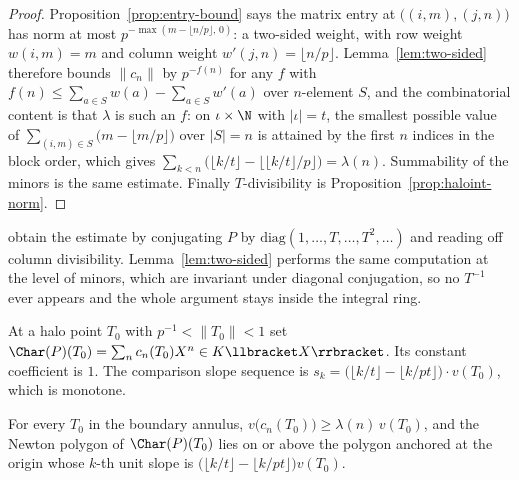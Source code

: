 \begin{proof}
  \leanok
  Proposition~\ref{prop:entry-bound} says the matrix entry at $\bigl((i,m),(j,n)\bigr)$ has norm
  at most $p^{-\max(m-\lfloor n/p\rfloor,\,0)}$: a two-sided weight, with row weight
  $w(i,m) = m$ and column weight $w'(j,n) = \lfloor n/p\rfloor$.  Lemma~\ref{lem:two-sided}
  therefore bounds $\lVert c_n\rVert$ by $p^{-f(n)}$ for any $f$ with
  $f(n)\leq \sum_{a\in S}w(a) - \sum_{a\in S}w'(a)$ over $n$-element $S$, and the combinatorial
  content is that $\lambda$ is such an $f$: on $\iota\times\N$ with $\lvert\iota\rvert = t$, the
  smallest possible value of $\sum_{(i,m)\in S}\bigl(m - \lfloor m/p\rfloor\bigr)$ over
  $\lvert S\rvert = n$ is attained by the first $n$ indices in the block order, which gives
  $\sum_{k<n}\bigl(\lfloor k/t\rfloor - \lfloor \lfloor k/t\rfloor/p\rfloor\bigr) = \lambda(n)$.
  Summability of the minors is the same estimate.  Finally $T$-divisibility is
  Proposition~\ref{prop:haloint-norm}.
\end{proof}

\cite{LWX} obtain the estimate by conjugating $P$ by $\mathrm{diag}(1,\dots,T,\dots,T^2,\dots)$
and reading off column divisibility.  Lemma~\ref{lem:two-sided} performs the same computation at
the level of minors, which are invariant under diagonal conjugation, so no $T^{-1}$ ever appears
and the whole argument stays inside the integral ring.

\begin{definition}
  \label{def:speccharseries}
  \leanok
  At a halo point $T_0$ with $p^{-1}<\lVert T_0\rVert<1$ set
  $\Char(P)(T_0) = \sum_n c_n(T_0)X^n \in K\llbracket X\rrbracket$.  Its constant coefficient is
  $1$.  The comparison slope sequence is
  $s_k = \bigl(\lfloor k/t\rfloor - \lfloor k/pt\rfloor\bigr)\cdot v(T_0)$, which is monotone.
\end{definition}

\begin{theorem}
  \label{thm:lwx318}
  \leanok
  For every $T_0$ in the boundary annulus, $v\bigl(c_n(T_0)\bigr) \geq \lambda(n)\,v(T_0)$, and
  the Newton polygon of $\Char(P)(T_0)$ lies on or above the polygon anchored at the origin
  whose $k$-th unit slope is $\bigl(\lfloor k/t\rfloor - \lfloor k/pt\rfloor\bigr)v(T_0)$.
\end{theorem}

